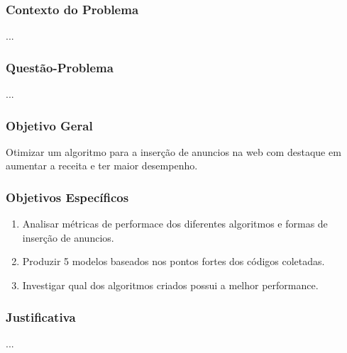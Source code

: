 \documentclass{beamer}
\begin{document}
\begin{frame}
    \frametitle{Contexto do Problema}
    ...
\end{frame}

\begin{frame}
    \frametitle{Questão-Problema}
    ...
\end{frame}

\begin{frame}
    \frametitle{Objetivo Geral}
    Otimizar um algoritmo para a inserção de anuncios na web com destaque em aumentar a receita e ter maior desempenho.
\end{frame}

\begin{frame}
    \frametitle{Objetivos Específicos}
    \begin{enumerate}
       \item Analisar métricas de performace dos diferentes algoritmos e formas de inserção de anuncios.
       \item Produzir 5 modelos baseados nos pontos fortes dos códigos coletadas.
       \item Investigar qual dos algoritmos criados possui a melhor performance.
     \end{enumerate}
\end{frame}

\begin{frame}
    \frametitle{Justificativa}
    ...
\end{frame}
\end{document}
